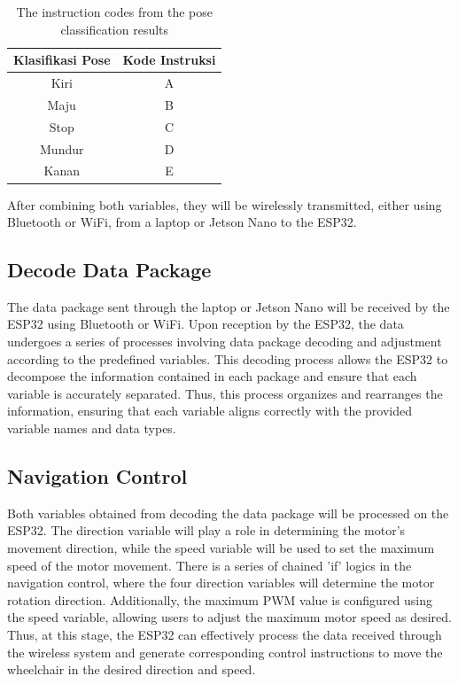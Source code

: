 \begin{table}[h]
  \centering
      \caption{The instruction codes from the pose classification results}
      \label{tbl:kode-instruksi}
      \begin{tabular}{|c|c|}
          \hline
          Klasifikasi Pose & Kode Instruksi \\ \hline
          Kiri             & A              \\ \hline
          Maju             & B              \\ \hline
          Stop             & C              \\ \hline
          Mundur           & D              \\ \hline
          Kanan            & E              \\ \hline
      \end{tabular}
\end{table}

After combining both variables, they will be wirelessly transmitted, either using Bluetooth or WiFi, from a laptop or Jetson Nano to the ESP32.

\subsection{Decode Data Package}
The data package sent through the laptop or Jetson Nano will be received by the ESP32 using Bluetooth or WiFi. Upon reception by the ESP32, the data undergoes a series of processes involving data package decoding and adjustment according to the predefined variables. This decoding process allows the ESP32 to decompose the information contained in each package and ensure that each variable is accurately separated. Thus, this process organizes and rearranges the information, ensuring that each variable aligns correctly with the provided variable names and data types.

\subsection{Navigation Control}
Both variables obtained from decoding the data package will be processed on the ESP32. The direction variable will play a role in determining the motor's movement direction, while the speed variable will be used to set the maximum speed of the motor movement. There is a series of chained 'if' logics in the navigation control, where the four direction variables will determine the motor rotation direction. Additionally, the maximum PWM value is configured using the speed variable, allowing users to adjust the maximum motor speed as desired. Thus, at this stage, the ESP32 can effectively process the data received through the wireless system and generate corresponding control instructions to move the wheelchair in the desired direction and speed.